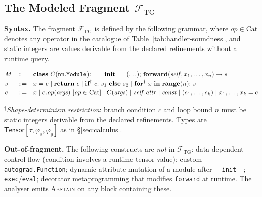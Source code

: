 \subsection{The Modeled Fragment $\mathcal{F}_\mathrm{TG}$}
\label{sec:fragment}

\noindent\textbf{Syntax.} The fragment $\mathcal{F}_\mathrm{TG}$ is defined by the following grammar,
where $\mathit{op}\in\mathrm{Cat}$ denotes any operator in the catalogue of
Table~\ref{tab:handler-soundness}, and static integers are values derivable
from the declared refinements without a runtime query.

{\small
\[
\begin{array}{@{}lll@{}}
M &::=& \textbf{class}\ C(\mathtt{nn.Module}){:}\ \textbf{\_\_init\_\_}(\ldots){;}\ \textbf{forward}(\mathit{self}, x_1,\dots,x_n) \to s \\[2pt]
s &::=& x = e \mid \textbf{return}\ e \mid \textbf{if}^{\dagger}\ c{:}\ s_1\ \textbf{else}\ s_2
 \mid \textbf{for}^{\dagger}\ x\ \textbf{in}\ \textbf{range}(n){:}\ s \\[2pt]
e &::=& x \mid e.\mathit{op}(\mathit{args})\ [\mathit{op}\in\mathrm{Cat}]
 \mid C(\mathit{args}) \mid \mathit{self}.\mathit{attr} \mid \mathit{const}
 \mid (e_1,\dots,e_k) \mid x_1,\dots,x_k = e
\end{array}
\]
}

\noindent${}^\dagger$\emph{Shape-determinism restriction}: branch condition $c$ and loop
bound $n$ must be static integers derivable from the declared refinements.
Types are $\mathsf{Tensor}[\tau,\varphi_s,\varphi_g]$ as in \S\ref{sec:calculus}.

\smallskip\noindent\textbf{Out-of-fragment.}
The following constructs are \emph{not} in $\mathcal{F}_\mathrm{TG}$:
data-dependent control flow (condition involves a runtime tensor value);
custom \texttt{autograd.Function}; dynamic attribute mutation of a module
after \texttt{\_\_init\_\_}; \texttt{exec}/\texttt{eval}; decorator
metaprogramming that modifies \texttt{forward} at runtime.
The analyser emits \textsc{Abstain} on any block containing these.

